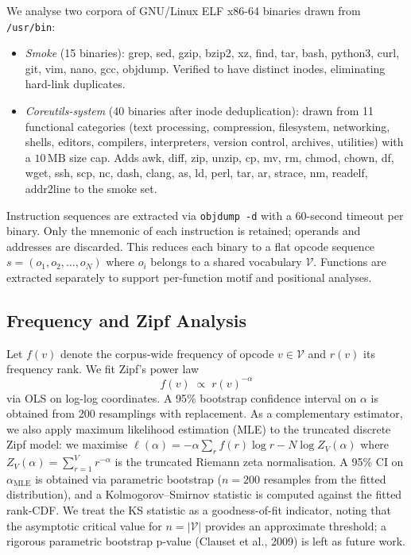 \documentclass[10pt,twocolumn]{article}
\begin{document}
We analyse two corpora of GNU/Linux ELF x86-64 binaries drawn from
\texttt{/usr/bin}:
\begin{itemize}
  \item \emph{Smoke} (15 binaries): grep, sed, gzip, bzip2, xz, find, tar,
        bash, python3, curl, git, vim, nano, gcc, objdump.  Verified to have
        distinct inodes, eliminating hard-link duplicates.
  \item \emph{Coreutils-system} (40 binaries after inode deduplication):
        drawn from 11 functional categories (text processing, compression,
        filesystem, networking, shells, editors, compilers, interpreters,
        version control, archives, utilities) with a $10\,\text{MB}$ size cap.
        Adds awk, diff, zip, unzip, cp, mv, rm, chmod, chown, df, wget, ssh,
        scp, nc, dash, clang, as, ld, perl, tar, ar, strace, nm, readelf,
        addr2line to the smoke set.
\end{itemize}

Instruction sequences are extracted via \texttt{objdump -d} with a 60-second
timeout per binary.  Only the mnemonic of each instruction is retained; operands
and addresses are discarded.  This reduces each binary to a flat opcode
sequence $s = (o_1, o_2, \ldots, o_N)$ where $o_i$ belongs to a shared
vocabulary $\mathcal{V}$.  Functions are extracted separately to support
per-function motif and positional analyses.

\subsection{Frequency and Zipf Analysis}

Let $f(v)$ denote the corpus-wide frequency of opcode $v \in \mathcal{V}$ and
$r(v)$ its frequency rank.  We fit Zipf's power law
\begin{equation}
  f(v) \;\propto\; r(v)^{-\alpha}
  \label{eq:zipf}
\end{equation}
via OLS on log-log coordinates.  A 95\% bootstrap confidence interval on
$\alpha$ is obtained from 200 resamplings with replacement.  As a
complementary estimator, we also apply maximum likelihood estimation (MLE)
to the truncated discrete Zipf model: we maximise
$\ell(\alpha) = -\alpha \sum_r f(r)\log r - N \log Z_V(\alpha)$
where $Z_V(\alpha) = \sum_{r=1}^{V} r^{-\alpha}$ is the truncated Riemann
zeta normalisation.  A 95\% CI on $\alpha_{\text{MLE}}$ is obtained via
parametric bootstrap ($n=200$ resamples from the fitted distribution), and
a Kolmogorov--Smirnov statistic is computed against the fitted rank-CDF.
We treat the KS statistic as a goodness-of-fit indicator, noting that the
asymptotic critical value for $n = |\mathcal{V}|$ provides an approximate
threshold; a rigorous parametric bootstrap p-value (Clauset et al., 2009)
is left as future work.
\end{document}
